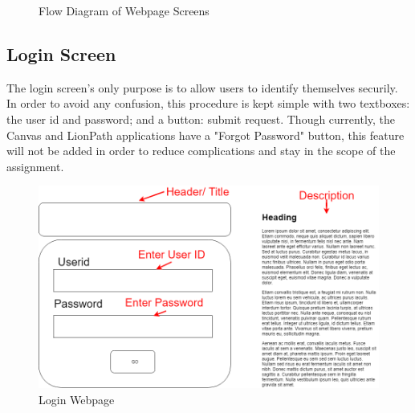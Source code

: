 \documentclass{article}
\begin{document}
    \begin{figure}[h]
    \begin{center}
    \caption{Flow Diagram of Webpage Screens}\label{fig:WebFlow}
    \end{center}
    \end{figure}

    \subsection{Login Screen}\label{sec:Web:Login}
      The login screen's only purpose is to allow users to identify themselves securily.  In order to avoid any confusion, this procedure is kept simple with two textboxes: the user id and password; and a button: submit request.  Though currently, the Canvas and LionPath applications have a "Forgot Password" button, this feature will not be added in order to reduce complications and stay in the scope of the assignment.

      \begin{figure}[H]
        \centering
        \includegraphics[width=4 in]{Design/LoginScreen}
        \caption{Login Webpage}
        \label{fig:login}
      \end{figure}
\end{document}
